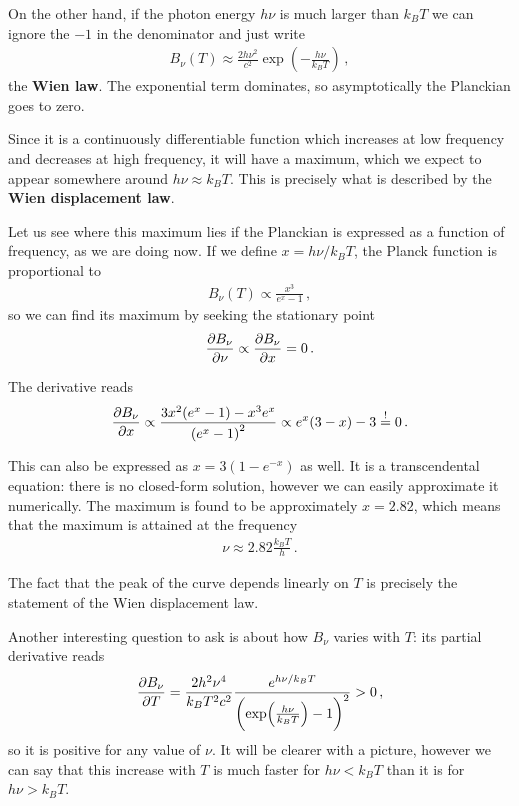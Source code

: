 \documentclass[main.tex]{subfiles}
\begin{document}
On the other hand, if the photon energy \(h \nu \) is much larger than \(k_B T\) we can ignore the \(-1\) in the denominator and just write 
%
\begin{align}
B_\nu (T) \approx \frac{2h \nu^2}{c^2} \exp(- \frac{h \nu }{k_B T})
\,,
\end{align}
%
the \textbf{Wien law}. 
The exponential term dominates, so asymptotically the Planckian goes to  zero. 

Since it is a continuously differentiable function which increases at low frequency and decreases at high frequency, it will have a maximum, which we expect to appear somewhere around \(h \nu \approx k_B T\). This is precisely what is described by the \textbf{Wien displacement law}. 

Let us see where this maximum lies if the Planckian is expressed as a function of frequency, as we are doing now. 
If we define \(x = h \nu / k_B T\), the Planck function is proportional to 
%
\begin{align}
B_\nu (T ) \propto \frac{x^3}{e^{x} - 1}
\,,
\end{align}
%
so we can find its maximum by seeking the stationary point 
%
\begin{align}
\pdv{B_\nu }{\nu } \propto \pdv{B_\nu }{x} = 0
\,. 
\end{align}

The derivative reads 
%
\begin{align}
\pdv{B_\nu }{x} \propto \frac{3 x^2 (e^{x}-1) - x^3 e^{x}}{\qty(e^{x} - 1)^2}
\propto e^{x} (3 - x) - 3 
\overset{!}{=} 0
\,.
\end{align}

This can also be expressed as \(x = 3 (1 - e^{-x})\) as well. 
It is a transcendental equation: there is no closed-form solution, however we can easily approximate it numerically. 
The maximum is found to be approximately \(x = \num{2.82}\), which means that the maximum is attained at the frequency 
%
\begin{align}
\nu \approx \num{2.82} \frac{k_B T}{h}
\,.
\end{align}

The fact that the peak of the curve depends linearly on \(T\) is precisely the statement of the Wien displacement law. 

Another interesting question to ask is about how \(B_\nu \) varies with \(T\): its partial derivative reads 
%
\begin{align}
\pdv{B_\nu }{T} = \frac{2 h^2 \nu^4}{k_B T^2 c^2} \frac{e^{h \nu  / k_B T}}{\qty(\exp(\frac{h \nu }{k_B T}) -1)^2} > 0
\,,
\end{align}
%
so it is positive for any value of \(\nu \). 
It will be clearer with a picture, however we can say that this increase with \(T\) is much faster for \(h \nu < k_B T\) than it is for \(h \nu > k_B T\). 
\end{document}
